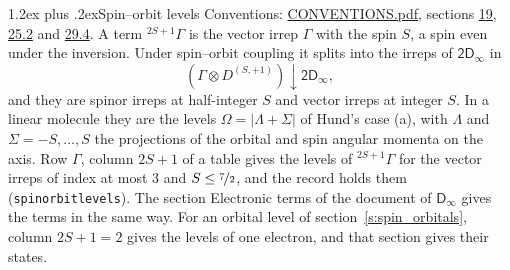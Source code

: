 \documentclass[10pt,a4paper]{article}
\makeatletter
\renewcommand\section{\@startsection{section}{1}{\z@}{-3ex plus -1ex minus -.2ex}%
  {1.2ex plus .2ex}{\normalfont\large\sffamily\bfseries\color{parttitle}}}
\numberwithin{equation}{section}
\newcommand{\grp}[1]{\mathsf{#1}}
\newcommand{\restr}[2]{#1\!\downarrow#2}
\newcommand{\irrJp}[2]{D^{(#1,#2)}}
\newcommand{\irrprod}{\otimes}
\newcommand{\term}[2]{{}^{#1}#2}
\makeatother
\begin{document}
\section{Spin--orbit levels}\label{s:spin_orbit}
Conventions: \href{../../CONVENTIONS.pdf}{CONVENTIONS.pdf}, sections \href{../../../rotation/CONVENTIONS.pdf\#conv.19}{19}, \href{../../CONVENTIONS.pdf\#conv.25.2}{25.2} and \href{../../CONVENTIONS.pdf\#conv.29.4}{29.4}.
\leavevmode\label{n:local.spin}\label{n:symbol.term}A term $\term{2S+1}{\Gamma}$ is the vector irrep $\Gamma$ with the spin $S$, a spin even under the inversion. Under spin--orbit coupling it splits into the irreps of $\grp{2D_{\infty }}$ in
\begin{equation}\label{e:spinorbit}\restr{(\Gamma \irrprod \irrJp{S}{+1})}{\grp{2D_{\infty }}},\end{equation}
and they are spinor irreps at half-integer $S$ and vector irreps at integer $S$. In a linear molecule they are the levels $\Omega = \lvert\Lambda + \Sigma\rvert$ of Hund's case (a), with $\Lambda$ and $\Sigma = -S, \dots, S$ the projections of the orbital and spin angular momenta on the axis. Row $\Gamma$, column $2S + 1$ of a table gives the levels of $\term{2S+1}{\Gamma}$ for the vector irreps of index at most 3 and $S \le \nicefrac{7}{2}$, and the record holds them (\texttt{spinorbitlevels}). The section Electronic terms of the document of \href{../../../rotation/data/pdf/Dinf.pdf}{$\grp{D_{\infty}}$} gives the terms in the same way. For an orbital level of section~\ref{s:spin_orbitals}, column $2S + 1 = 2$ gives the levels of one electron, and that section gives their states.
\end{document}
